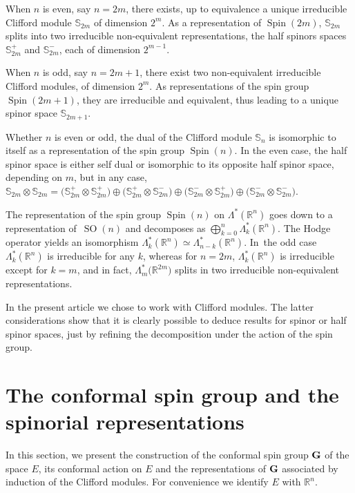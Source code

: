 \documentclass[10pt,a4paper]{amsart}
\DeclareMathOperator{\Spin}{Spin}
\DeclareMathOperator{\SO}{SO}
\numberwithin{equation}{section}
\begin{document}
When $n$ is even, say $n=2m$, there exists, up to equivalence a unique irreducible Clifford module $\mathbb S_{2m}$ of dimension $2^m$. As a representation of $\Spin(2m)$, $\mathbb S_{2m}$ splits into two irreducible non-equivalent representations, the half spinors spaces $\mathbb S^+_{2m}$ and $\mathbb S^-_{2m}$, each of dimension $2^{m-1}$.

When $n$ is odd, say $n=2m+1$, there exist two non-equivalent irreducible Clifford modules, of dimension $2^m$. As representations of the spin group $\Spin(2m+1)$, they are irreducible and equivalent, thus leading to a unique spinor space $\mathbb S_{2m+1}$.


Whether $n$ is even or odd, the dual of the Clifford module $\mathbb S_n$ is isomorphic to itself as a representation of the spin group $\Spin(n)$. In the even case, the half spinor space is either self dual or isomorphic to its opposite half spinor space, depending on $m$, but in any case,
$\mathbb S_{2m}\otimes \mathbb S_{2m}= \big(\mathbb S_{2m}^+\otimes \mathbb S_{2m}^+\big)\oplus \big(\mathbb S_{2m}^+\otimes \mathbb S_{2m}^-\big)\oplus \big(\mathbb S_{2m}^-\otimes \mathbb S_{2m}^+\big) \oplus \big( \mathbb S_{2m}^-\otimes \mathbb S_{2m}^-\big)$.

{\sloppy
The representation of the spin group $\Spin(n)$ on $\Lambda^*(\mathbb R^n)$ goes down to a representation of~$\SO(n)$ and decomposes as $\bigoplus_{k=0}^n \Lambda^*_k(\mathbb R^n)$. The Hodge operator yields an isomorphism \mbox{$\Lambda^*_k(\mathbb R^n) \simeq \Lambda^*_{n-k}(\mathbb R^n)$}. In~the odd case $\Lambda^*_k(\mathbb R^n)$ is irreducible for any $k$, whereas for $n=2m$, $\Lambda^*_k(\mathbb R^n)$ is irreducible except for $k=m$, and in fact, $\Lambda^*_m\big(\mathbb R^{2m}\big)$ splits in two irreducible non-equivalent representations.

}

 In the present article we chose to work with Clifford modules. The latter considerations show that it is clearly possible to deduce results for spinor or half spinor spaces, just by refining the decomposition under the action of the spin group.

\section{The conformal spin group and the spinorial representations}

In this section, we present the construction of the conformal spin group $\bf G$ of the space $E$, its conformal action on $E$ and the representations of $\bf G$ associated by induction of the Clifford modules. For convenience we identify $E$ with $\mathbb R^n$.
\end{document}
